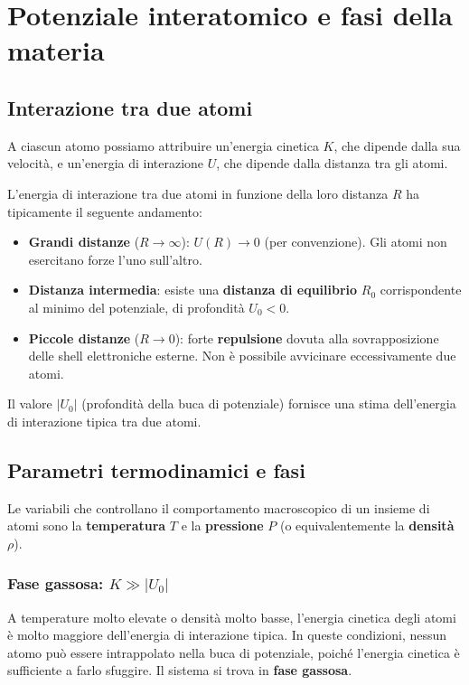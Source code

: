 \section{Potenziale interatomico e fasi della materia}

\subsection*{Interazione tra due atomi}

A ciascun atomo possiamo attribuire un'energia cinetica $K$, che dipende dalla sua velocità, e un'energia di interazione $U$, che dipende dalla distanza tra gli atomi.

L'energia di interazione tra due atomi in funzione della loro distanza $R$ ha tipicamente il seguente andamento:

\begin{itemize}
    \item \textbf{Grandi distanze} ($R \to \infty$): $U(R) \to 0$ (per convenzione). Gli atomi non esercitano forze l'uno sull'altro.
    \item \textbf{Distanza intermedia}: esiste una \textbf{distanza di equilibrio} $R_0$ corrispondente al minimo del potenziale, di profondità $U_0 < 0$.
    \item \textbf{Piccole distanze} ($R \to 0$): forte \textbf{repulsione} dovuta alla sovrapposizione delle shell elettroniche esterne. Non è possibile avvicinare eccessivamente due atomi.
\end{itemize}



Il valore $|U_0|$ (profondità della buca di potenziale) fornisce una stima dell'energia di interazione tipica tra due atomi.

\subsection*{Parametri termodinamici e fasi}

Le variabili che controllano il comportamento macroscopico di un insieme di atomi sono la \textbf{temperatura} $T$ e la \textbf{pressione} $P$ (o equivalentemente la \textbf{densità} $\rho$).

\subsubsection{Fase gassosa: $K \gg |U_0|$}

A temperature molto elevate o densità molto basse, l'energia cinetica degli atomi è molto maggiore dell'energia di interazione tipica. In queste condizioni, nessun atomo può essere intrappolato nella buca di potenziale, poiché l'energia cinetica è sufficiente a farlo sfuggire. Il sistema si trova in \textbf{fase gassosa}.

